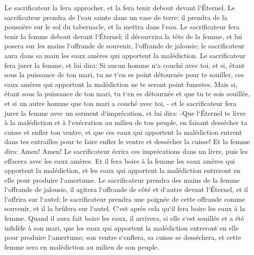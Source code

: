 \verse Le sacrificateur la fera approcher, et la fera tenir debout devant l`Éternel. 
\verse Le sacrificateur prendra de l`eau sainte dans un vase de terre; il prendra de la poussière sur le sol du tabernacle, et la mettra dans l`eau. 
\verse Le sacrificateur fera tenir la femme debout devant l`Éternel; il découvrira la tête de la femme, et lui posera sur les mains l`offrande de souvenir, l`offrande de jalousie; le sacrificateur aura dans sa main les eaux amères qui apportent la malédiction. 
\verse Le sacrificateur fera jurer la femme, et lui dira: Si aucun homme n`a couché avec toi, et si, étant sous la puissance de ton mari, tu ne t`en es point détournée pour te souiller, ces eaux amères qui apportent la malédiction ne te seront point funestes. 
\verse Mais si, étant sous la puissance de ton mari, tu t`en es détournée et que tu te sois souillée, et si un autre homme que ton mari a couché avec toi, - 
\verse et le sacrificateur fera jurer la femme avec un serment d`imprécation, et lui dira: -Que l`Éternel te livre à la malédiction et à l`exécration au milieu de ton peuple, en faisant dessécher ta cuisse et enfler ton ventre, 
\verse et que ces eaux qui apportent la malédiction entrent dans tes entrailles pour te faire enfler le ventre et dessécher la cuisse! Et la femme dira: Amen! Amen! 
\verse Le sacrificateur écrira ces imprécations dans un livre, puis les effacera avec les eaux amères. 
\verse Et il fera boire à la femme les eaux amères qui apportent la malédiction, et les eaux qui apportent la malédiction entreront en elle pour produire l`amertume. 
\verse Le sacrificateur prendra des mains de la femme l`offrande de jalousie, il agitera l`offrande de côté et d`autre devant l`Éternel, et il l`offrira sur l`autel; 
\verse le sacrificateur prendra une poignée de cette offrande comme souvenir, et il la brûlera sur l`autel. C`est après cela qu`il fera boire les eaux à la femme. 
\verse Quand il aura fait boire les eaux, il arrivera, si elle s`est souillée et a été infidèle à son mari, que les eaux qui apportent la malédiction entreront en elle pour produire l`amertume; son ventre s`enflera, sa cuisse se desséchera, et cette femme sera en malédiction au milieu de son peuple. 

